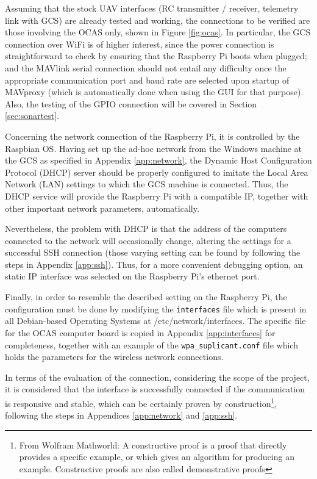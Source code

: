 Assuming that the stock UAV interfaces (RC transmitter / receiver, telemetry link with GCS) are already tested and working, the connections to be verified are those involving the OCAS only, shown in Figure \ref{fig:ocas}.
In particular, the GCS connection over WiFi is of higher interest, since the power connection is straightforward to check by ensuring that the Raspberry Pi boots when plugged; and the MAVlink serial connection should not entail any difficulty once the appropriate communication port and baud rate are selected upon startup of MAVproxy (which is automatically done when using the GUI for that purpose).
Also, the testing of the GPIO connection will be covered in Section \ref{sec:sonartest}.

Concerning the network connection of the Raspberry Pi, it is controlled by the Raspbian OS.
Having set up the ad-hoc network from the Windows machine at the GCS as specified in Appendix \ref{app:network}, the Dynamic Host Configuration Protocol (DHCP) server should be properly configured to imitate the Local Area Network (LAN) settings to which the GCS machine is connected.
Thus, the DHCP service will provide the Raspberry Pi with a compatible IP, together with other important network parameters, automatically. 

Nevertheless, the problem with DHCP is that the address of the computers connected to the network will occasionally change, altering the settings for a successful SSH connection (those varying setting can be found by following the steps in Appendix \ref{app:ssh}).
Thus, for a more convenient debugging option, an static IP interface was selected on the Raspberry Pi's ethernet port.

Finally, in order to resemble the described setting on the Raspberry Pi, the configuration must be done by modifying the \texttt{interfaces} file which is present in all Debian-based Operating Systems at /etc/network/interfaces.
The specific file for the OCAS computer board is copied in Appendix \ref{app:interfaces} for completeness, together with an example of the \texttt{wpa\_suplicant.conf} file which holds the parameters for the wireless network connections.

In terms of the evaluation of the connection, considering the scope of the project, it is considered that the interface is successfully connected if the communication is responsive and stable, which can be certainly proven by construction\footnote{From Wolfram Mathworld: A constructive proof is a proof that directly provides a specific example, or which gives an algorithm for producing an example. Constructive proofs are also called demonstrative proofs}, following the steps in Appendices \ref{app:network} and \ref{app:ssh}.

